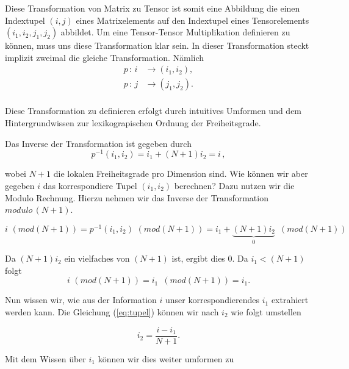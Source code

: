 Diese Transformation von Matrix zu Tensor ist somit eine Abbildung die einen Indextupel $(i,j)$ eines Matrixelements auf den Indextupel eines Tensorelements $(i_1,i_2,j_1,j_2)$ abbildet. Um eine Tensor-Tensor Multiplikation definieren zu können, muss uns diese Transformation klar sein.
In dieser Transformation steckt implizit zweimal die gleiche Transformation. Nämlich
\begin{equation*}
\begin{aligned}
p \, : \, i &\rightarrow (i_1,i_2) ,\\
p \, : \, j &\rightarrow (j_1,j_2) .\\
\end{aligned}
\end{equation*}

Diese Transformation zu definieren erfolgt durch intuitives Umformen und dem Hintergrundwissen zur lexikograpischen Ordnung der Freiheitsgrade.

Das Inverse der Transformation ist gegeben durch
\begin{equation} \label{eq:tupel}
p^{-1}(i_1,i_2) = i_1 + (N+1)i_2 = i \, ,
\end{equation}

wobei $N+1$ die lokalen Freiheitsgrade pro Dimension sind.
Wie können wir aber gegeben $i$ das korrespondiere Tupel $(i_1,i_2)$ berechnen?
Dazu nutzen wir die Modulo Rechnung. Hierzu nehmen wir das Inverse der Transformation $modulo \, (N+1)$. 

\begin{equation}
i \, \, (mod (N+1))=p^{-1}(i_1,i_2) \, \, (mod (N+1)) = i_1 + \underbrace{(N+1)i_2}_{0} \, \, \, (mod (N+1)) 
\end{equation}

Da $(N+1)i_2$ ein vielfaches von $(N+1)$ ist, ergibt dies 0. Da $i_1 < (N+1)$ folgt 
\begin{equation}
i \, \, (mod (N+1)) = i_1 \, \, \, (mod (N+1)) = i_1.
\end{equation}

Nun wissen wir, wie aus der Information $i$ unser korrespondierendes $i_1$ extrahiert werden kann. Die Gleichung (\ref{eq:tupel}) können wir nach $i_2$ wie folgt umstellen

\begin{equation} \label{eq:tupel2}
 i_2 = \dfrac{ i - i_1 } {N+1}.
\end{equation}

Mit dem Wissen über $i_1$ können wir dies weiter umformen zu

